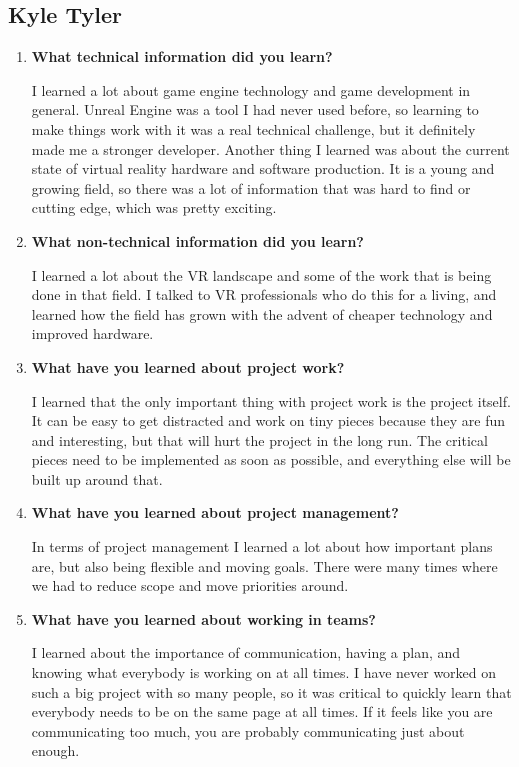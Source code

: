 \documentclass[onecolumn, draftclsnofoot,10pt, compsoc]{IEEEtran}
\begin{document}
\subsection{Kyle Tyler}
\begin{enumerate}
    \item \textbf{What technical information did you learn?}
    
    I learned a lot about game engine technology and game development in general. Unreal Engine was a tool I had never used before, so learning to make things work with it was a real technical challenge, but it definitely made me a stronger developer. Another thing I learned was about the current state of virtual reality hardware and software production. It is a young and growing field, so there was a lot of information that was hard to find or cutting edge, which was pretty exciting. 
    
    \item \textbf{What non-technical information did you learn?}
    
    I learned a lot about the VR landscape and some of the work that is being done in that field. I talked to VR professionals who do this for a living, and learned how the field has grown with the advent of cheaper technology and improved hardware. 
    
    \item \textbf{What have you learned about project work?}
    
    I learned that the only important thing with project work is the project itself. It can be easy to get distracted and work on tiny pieces because they are fun and interesting, but that will hurt the project in the long run. The critical pieces need to be implemented as soon as possible, and everything else will be built up around that. 
    
    \item \textbf{What have you learned about project management?}
    
    In terms of project management I learned a lot about how important plans are, but also being flexible and moving goals. There were many times where we had to reduce scope and move priorities around.
    
    \item \textbf{What have you learned about working in teams?}
    
    I learned about the importance of communication, having a plan, and knowing what everybody is working on at all times. I have never worked on such a big project with so many people, so it was critical to quickly learn that everybody needs to be on the same page at all times. If it feels like you are communicating too much, you are probably communicating just about enough.
    

\end{enumerate}
\end{document}
